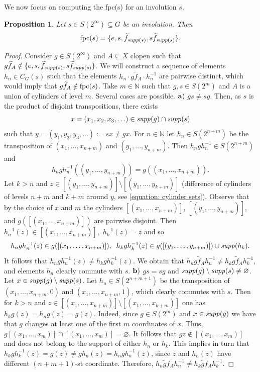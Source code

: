 \documentclass[11pt]{amsart}
\newcommand{\N}{\mathbb N}
\newcommand{\suppg}{{\it supp}}
\newcommand{\fpc}{{\rm fpc}}
\theoremstyle{plain}
\newtheorem{proposition}[theorem]{Proposition}
\theoremstyle{definition}
\theoremstyle{remark}
\numberwithin{equation}{section}
\begin{document}
We now focus on computing the \fpc(s) for an involution $s$.
\begin{proposition}\label{prop: fpc of involution in S(2^infty)}
Let $s\in S(2^\infty)\subseteq G$ be an involution. Then $$\fpc(s)=\{e,s,\widetilde f_{\suppg(s)},s\widetilde f_{\suppg(s)}\}.$$
\end{proposition}
\begin{proof}
Consider $g \in S(2^\infty)$ and $A\subseteq X$ clopen such that $g\widetilde f_A\notin\{e,s,\widetilde f_{\suppg(s)},s\widetilde f_{\suppg(s)}\}$. We will construct a sequence of elements $h_n\in C_G(s)$ such that the elements $h_n\cdot g\widetilde f_A\cdot h_n^{-1}$ are pairwise distinct, which would imply that $g\widetilde f_A\notin \fpc(s)$. Take $m\in \N$ such that $g,s\in S(2^m)$ and $A$ is a union of cylinders of level $m$. Several cases are possible.\vskip 0.1cm\noindent
	${\bf a})$ $gs\neq sg$. Then, as $s$ is the product of disjoint transpositions, there exists $$x=(x_1,x_2,x_3,\ldots)\in \suppg(g)\cap \suppg(s)$$ such that $y=(y_1,y_2,y_3,\ldots):=sx\neq gx$. For $n\in\mathbb N$ let $h_n\in S(2^{n+m})$ be the transposition of $(x_1,\ldots,x_{n+m})$ and $(y_1,\ldots,y_{n+m})$. Then $h_ngh_n^{-1}\in S(2^{n+m})$ and $$h_ngh_n^{-1}((y_1,
	\ldots,y_{n+m}))=g((x_1,
	\ldots,x_{n+m})).$$ Let $k>n$ and $z\in [(y_1,\ldots,y_{n+m})]\setminus [(y_1,\ldots,y_{k+m})]$ (difference of cylinders of levels $n+m$ and $k+m$ around $y$, see \eqref{equation: cylinder sets}). Observe that by the choice of $x$ and $m$ the cylinders $[(x_1,\ldots,x_{n+m})]$, $[(y_1,\ldots,y_{n+m})]$, and $g([(x_1,\ldots,x_{n+m})])$ are pairwise disjoint. 
	Then 
	$h_n^{-1}(z)\in[(x_1,\ldots,x_{n+m})],$ 
	$h_k^{-1}(z)=z$ and so $$h_ngh_n^{-1}(z)\in g([(x_1,\ldots,x_{n+m})]),\;\; h_kgh_k^{-1}(z)\in g([(y_1,\ldots,y_{n+m})])\cup\suppg(h_k).$$ It follows that $h_ngh_n^{-1}(z)\neq h_kgh_k^{-1}(z)$. We obtain that $h_n g\widetilde f_Ah_n^{-1}\neq h_k g \widetilde f_Ah_k^{-1}$, and elements $h_n$ clearly commute with $s$. \vskip 0.1cm\noindent 
	${\bf b)}$ $gs=sg$ and  $\suppg(g)\setminus \suppg(s)\neq\varnothing$. Let $x\in\suppg(g)\setminus\suppg(s)$. Let $h_n\in S(2^{n+m+1})$ be the transposition of $(x_1,\ldots,x_{n+m},0)$ and $(x_1,\ldots,x_{n+m},1)$, which clearly commutes with $s$. Then for $k>n$ and $z\in [(x_1,\ldots,x_{n+m})]\setminus [(x_1,\ldots,x_{k+m})]$ one has  $h_kg(z) = h_n g(z) = g(z)$. Indeed, since $g\in S(2^m)$ and $x\in \suppg(g)$ we have that $g$ changes at least one of the first $m$ coordinates of $x$. Thus, $g[(x_1,\ldots,x_m)]\cap [(x_1,\ldots, x_m)]=\varnothing$. It follows that $gz\notin [(x_1,\ldots, x_m)]$ and does not belong to the support of either $h_n$ or $h_k$. This implies in turn that  $h_kgh_k^{-1}(z)=g(z)\neq gh_n(z)=h_ngh_n^{-1}(z)$, since $z$ and $h_n(z)$ have different $(n+m+1)$-st coordinate. Therefore, $h_n\widetilde gf_Ah_n^{-1}\neq h_k\widetilde  gf_Ah_k^{-1}$.

\end{proof}
\end{document}
